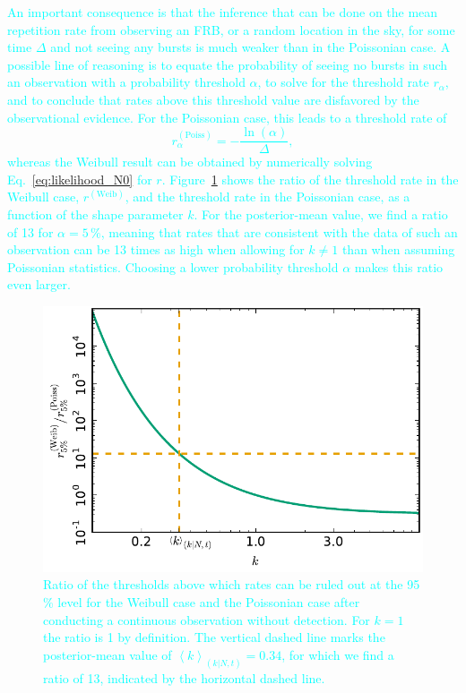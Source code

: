 \documentclass[fleqn,usenatbib]{mnras}
\newcommand{\new}[1]{\textcolor{cyan}{#1}}
\begin{document}
\new{An important consequence is that the inference that can be done on the mean repetition rate from observing an FRB, or a random location in the sky, for some time $\Delta$ and not seeing any bursts is much weaker than in the Poissonian case. A possible line of reasoning is to equate the probability of seeing no bursts in such an observation with a probability threshold $\alpha$, to solve for the threshold rate $r_\alpha$, and to conclude that rates above this threshold value are disfavored by the observational evidence. For the Poissonian case, this leads to a threshold rate of
\begin{equation}
	r^{\mathrm{(Poiss)}}_\alpha = - \frac{\ln(\alpha)}{\Delta},
\end{equation}
whereas the Weibull result can be obtained by numerically solving Eq.~\eqref{eq:likelihood_N0} for $r$. Figure~\ref{fig:ruleout} shows the ratio of the threshold rate in the Weibull case, $r^{\mathrm{(Weib)}}$, and the threshold rate in the Poissonian case, as a function of the shape parameter $k$. For the posterior-mean value, we find a ratio of 13 for $\alpha = 5\,\%$, meaning that rates that are consistent with the data of such an observation can be 13 times as high when allowing for $k \neq 1$ than when assuming Poissonian statistics. Choosing a lower probability threshold $\alpha$ makes this ratio even larger.}

\begin{figure}
	\includegraphics[width=1.0\columnwidth]{rule_out_rate.pdf}
	\caption{\label{fig:ruleout}\new{Ratio of the thresholds above which rates can be ruled out at the 95\,\% level for the Weibull case and the Poissonian case after conducting a continuous observation without detection. For $k = 1$ the ratio is 1 by definition. The vertical dashed line marks the posterior-mean value of $\left<k\right>_{(k|N,t)}=0.34$, for which we find a ratio of 13, indicated by the horizontal dashed line.}}
\end{figure}
\end{document}
